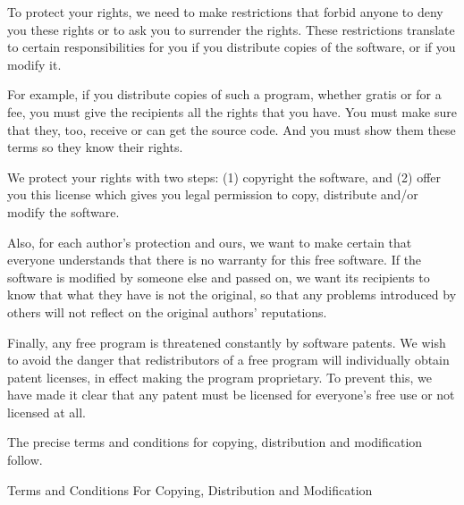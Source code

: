 \documentclass{article}
\begin{document}
      To protect your rights, we need to make restrictions that forbid anyone to
      deny you these rights or to ask you to surrender the rights.  These
      restrictions translate to certain responsibilities for you if you
      distribute copies of the software, or if you modify it.
      
      For example, if you distribute copies of such a program, whether gratis or
      for a fee, you must give the recipients all the rights that you have.  You
      must make sure that they, too, receive or can get the source code.  And
      you must show them these terms so they know their rights.
      
      We protect your rights with two steps: (1) copyright the software, and (2)
      offer you this license which gives you legal permission to copy,
      distribute and/or modify the software.
      
      Also, for each author's protection and ours, we want to make certain that
      everyone understands that there is no warranty for this free software.  If
      the software is modified by someone else and passed on, we want its
      recipients to know that what they have is not the original, so that any
      problems introduced by others will not reflect on the original authors'
      reputations.
      
      Finally, any free program is threatened constantly by software patents.
      We wish to avoid the danger that redistributors of a free program will
      individually obtain patent licenses, in effect making the program
      proprietary.  To prevent this, we have made it clear that any patent must
      be licensed for everyone's free use or not licensed at all.
      
      The precise terms and conditions for copying, distribution and
      modification follow.
      
      \begin{center}
      {\Large \sc Terms and Conditions For Copying, Distribution and
        Modification}
      \end{center}
      
\end{document}

